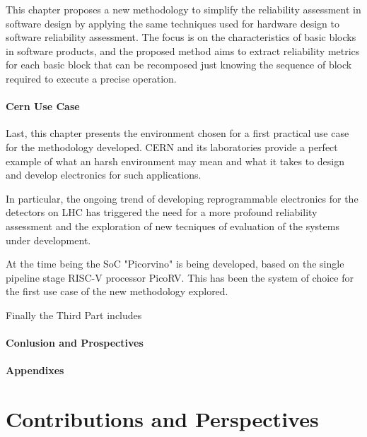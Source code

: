 \documentclass[./dissertation.tex]{subfiles}
\begin{document}
This chapter proposes a new methodology to simplify the reliability assessment in software design by applying the same techniques used for hardware design to software reliability assessment. The focus is on the characteristics of basic blocks in software products, and the proposed method aims to extract reliability metrics for each basic block that can be recomposed just knowing the sequence of block required to execute a precise operation.
\paragraph{Cern Use Case}
Last, this chapter presents the environment chosen for a first practical use case for the methodology developed. CERN and its laboratories provide a perfect example of what an harsh environment may mean and what it takes to design and develop electronics for such applications.

In particular, the ongoing trend of developing reprogrammable electronics for the detectors on LHC has triggered the need for a more profound reliability assessment and the exploration of new tecniques of evaluation of the systems under development.

At the time being the SoC "Picorvino" is being developed, based on the single pipeline stage RISC-V processor PicoRV. This has been the system of choice for the first use case of the new methodology explored.

Finally the Third Part includes
\paragraph{Conlusion and Prospectives}

\paragraph{Appendixes}

\section{Contributions and Perspectives}
\end{document}
